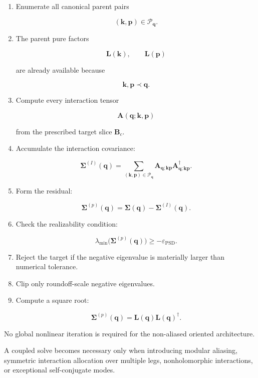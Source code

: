 \documentclass[
  11pt,
  a4paper,
]{article}
\begin{document}
\begin{enumerate}
\def\labelenumi{\arabic{enumi}.}
\item
  Enumerate all canonical parent pairs

  \[
  (\boldsymbol k,\boldsymbol p)\in\mathcal P_{\boldsymbol q}.
  \]
\item
  The parent pure factors

  \[
  \boldsymbol L(\boldsymbol k),
  \qquad
  \boldsymbol L(\boldsymbol p)
  \]

  are already available because

  \[
  \boldsymbol k,\boldsymbol p\prec\boldsymbol q.
  \]
\item
  Compute every interaction tensor

  \[
  \boldsymbol A(\boldsymbol q;\boldsymbol k,\boldsymbol p)
  \]

  from the prescribed target slice \(\boldsymbol B_c\).
\item
  Accumulate the interaction covariance:

  \[
  \boldsymbol\Sigma^{(I)}(\boldsymbol q)
  =
  \sum_{(\boldsymbol k,\boldsymbol p)\in\mathcal P_{\boldsymbol q}}
  \boldsymbol A_{\boldsymbol q;\boldsymbol k\boldsymbol p}
  \boldsymbol A_{\boldsymbol q;\boldsymbol k\boldsymbol p}^\dagger.
  \]
\item
  Form the residual:

  \[
  \boldsymbol\Sigma^{(p)}(\boldsymbol q)
  =
  \boldsymbol\Sigma(\boldsymbol q)
  -
  \boldsymbol\Sigma^{(I)}(\boldsymbol q).
  \]
\item
  Check the realizability condition:

  \[
  \lambda_{\min}
  \bigl(
  \boldsymbol\Sigma^{(p)}(\boldsymbol q)
  \bigr)
  \ge
  -\varepsilon_{\mathrm{PSD}}.
  \]
\item
  Reject the target if the negative eigenvalue is materially larger than
  numerical tolerance.
\item
  Clip only roundoff-scale negative eigenvalues.
\item
  Compute a square root:

  \[
  \boldsymbol\Sigma^{(p)}(\boldsymbol q)
  =
  \boldsymbol L(\boldsymbol q)
  \boldsymbol L(\boldsymbol q)^\dagger.
  \]
\end{enumerate}

No global nonlinear iteration is required for the non-aliased oriented
architecture.

A coupled solve becomes necessary only when introducing modular
aliasing, symmetric interaction allocation over multiple legs,
nonholomorphic interactions, or exceptional self-conjugate modes.
\end{document}
